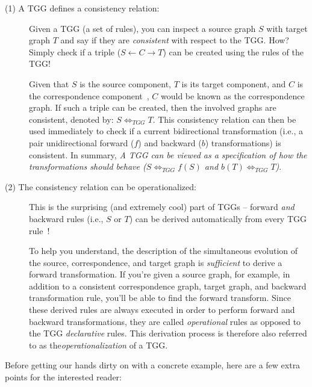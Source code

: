 \begin{description}

\item[(1) A TGG defines a consistency relation:]%
Given a TGG (a set of rul\-es), you can inspect a source graph $S$ with target graph $T$ and say if they are \emph{consistent} with respect to the TGG. How?
Simply check if a triple ($S\leftarrow C\rightarrow T$) can be created using the rules of the TGG!

\vspace{0.25cm}

Given that $S$ is the source component, $T$ is its target component, and $C$ is the correspondence component~\cite{Hermann2011a}, $C$ would be known as the
correspondence graph. If such a triple can be created, then the involved graphs are consistent, denoted by: $S \Leftrightarrow_{TGG} T$. This consistency
relation can then be used immediately to check if a current bidirectional transformation (i.e., a pair unidirectional forward ($f$) and backward ($b$)
transformations) is consistent. In summary, \emph{A TGG can be viewed as a specification of how the transformations \emph{should} behave ($S
\Leftrightarrow_{TGG} f(S)$ and $b(T) \Leftrightarrow_{TGG} T$)}.
	
\item[(2) The consistency relation can be operationalized:]%
This is the surprising (and extremely cool) part of TGGs -- forward \emph{and} backward rules (i.e., $S$ or $T$) can be derived automatically from every TGG
rule~\cite{Giese2010,Hermann2011a}! 

To help you understand, the description of the simultaneous evolution of the source, correspondence, and target graph is \emph{sufficient} to derive a forward
transformation. If you're given a source graph, for example, in addition to a consistent correspondence graph, target graph, and backward transformation rule,
you'll be able to find the forward transform. Since these derived rules are always executed in order to perform forward and backward transformations, they are
called \emph{operational} rules as opposed to the TGG \emph{declarative} rules. This derivation process is therefore also referred to as
the\emph{operationalization} of a TGG.
	
\end{description}

\vspace{0.5cm}

Before getting our hands dirty on with a concrete example, here are a few extra points for the interested reader:  

